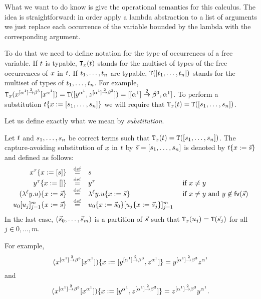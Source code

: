 What we want to do know is give the operational semantics for this calculus.
The idea is straightforward: in order apply a lambda abstraction to a list of arguments we just
replace each occurrence of the variable bounded by the lambda with the corresponding argument.

To do that we need to define notation for the type
of occurrences of a free variable. If $t$ is typable,
$\mathtt{T}_{x}(t)$
stands for the multiset
of types of the free occurrences of $x$ in $t$.
If $t_1,\hdots,t_n$ are typable,
$\mathtt{T}([t_1,\hdots,t_n])$ stands for the multiset
of types of $t_1,\hdots,t_n$.
For example,
$\mathtt{T}_{x}(x^{[\alpha^1] \overset{2}{\to} \beta^3}[x^{\alpha^1}]) =
\mathtt{T}([y^{\alpha^1},z^{[\alpha^1] \overset{2}{\to} \beta^3}]) = [[\alpha^1] \overset{2}{\to} \beta^3,\alpha^1]$.
To perform a substitution $t\{x := [s_1,\hdots,s_n]\}$
we will require that $\mathtt{T}_{x}(t) = \mathtt{T}([s_1,\hdots,s_n])$.


Let us define exactly what we mean by \emph{substitution}.
\begin{definition}[Substitution]
Let $t$ and $s_1,\hdots,s_n$ be correct terms such that $\mathtt{T}_{x}(t) = \mathtt{T}([s_1,\hdots,s_n])$.
The capture-avoiding substitution of $x$ in $t$ by $\vec{s} = [s_1,\hdots,s_n]$
is denoted by $t\{x := \vec{s}\}$ and defined as follows:
\[
  \begin{array}{rcll}
    x^\tau\{x := [s]\} & \overset{\mathrm{def}}{=} & s
  \\
    y^\tau\{x := []\} & \overset{\mathrm{def}}{=} & y^\tau
    & \text{ if $x \neq y$}
  \\
    (\lambda^{\ell} y. u)\{x := \vec{s}\} & \overset{\mathrm{def}}{=} &  \lambda^{\ell} y.  u\{x := \vec{s}\}
    & \text{ if $x \neq y$ and $y \not\in \mathsf{fv}({\vec{s}})$}
  \\
    u_0[u_j]_{j=1}^{m}\{x := \vec{s}\} & \overset{\mathrm{def}}{=} &
    u_0\{x := \vec{s}_0\}[u_j\{x := \vec{s}_j\}]_{j=1}^{m}
  \end{array}
\]
In the last case, $(\vec{s}_0, \hdots, \vec{s}_m)$
is a partition of $\vec{s}$
such that $\mathtt{T}_{x}(u_j) = \mathtt{T}(\vec{s}_j)$ for all $j \in {0,\hdots,m}$.
\end{definition}

For example,
\[(x^{[\alpha^1] \overset{2}{\to} \beta^3}[x^{\alpha^1}])\{x := [y^{[\alpha^1] \overset{2}{\to} \beta^3},z^{\alpha^1}]\}
= y^{[\alpha^1] \overset{2}{\to} \beta^3}z^{\alpha^1}\]
and
\[(x^{[\alpha^1] \overset{2}{\to} \beta^3}[x^{\alpha^1}])\{x := [y^{\alpha^1},z^{[\alpha^1] \overset{2}{\to} \beta^3}]\}
= z^{[\alpha^1] \overset{2}{\to} \beta^3}y^{\alpha^1}.\]


